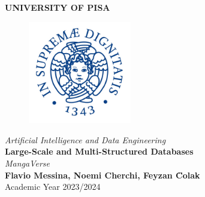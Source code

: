 \begin{titlepage}
    \centering
    \vspace*{\fill}
    {\LARGE \textbf{UNIVERSITY OF PISA}}\\[0.5cm]
    \begin{figure}[h]
        \centering
        \includegraphics[width=0.4\textwidth]{Media/university-of-Pisa-logo.jpg} 
    \end{figure}
    {\Large \textit{Artificial Intelligence and Data Engineering}}\\[1.5cm]
    {\LARGE \textbf{Large-Scale and Multi-Structured Databases}}\\[1cm]
    {\Large \textit{MangaVerse}}\\[8cm]
    {\large \textbf{Flavio Messina, Noemi Cherchi, Feyzan \"Colak}}\\[0.5cm]
    {\large Academic Year 2023/2024}
    \vspace*{\fill}
\end{titlepage}